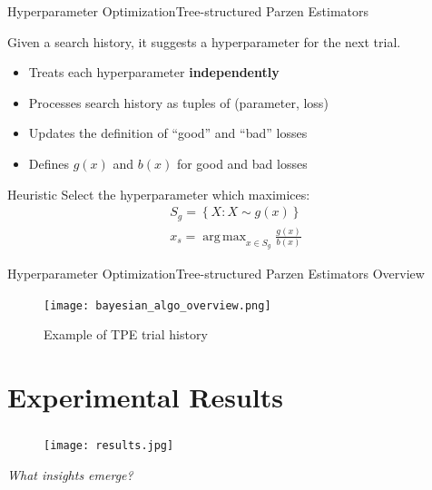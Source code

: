 \documentclass{beamer}
\DeclareMathOperator*{\argmax}{arg\,max}
\begin{document}
            \begin{frame}{Hyperparameter Optimization}{Tree-structured Parzen Estimators}

                Given a search history, it suggests a hyperparameter for the next trial.
                \begin{itemize}
                    \item Treats each hyperparameter \textbf{independently}
                    \item Processes search history as tuples of (parameter, loss)
                    \item Updates the definition of \enquote{good} and \enquote{bad} losses
                    \item Defines $g(x)$ and $b(x)$ for good and bad losses
                \end{itemize}

                \begin{exampleblock}{Heuristic}
                    Select the hyperparameter which maximices:
                    \begin{equation}
                        \begin{gathered}
                            S_g = \left\{X: X \sim g(x)\right\} \\
                            x_s = \argmax_{x \in S_g} \frac{g(x)}{b(x)}
                        \end{gathered}
                    \end{equation}
                \end{exampleblock}
            \end{frame}

            \begin{frame}{Hyperparameter Optimization}{Tree-structured Parzen Estimators Overview}
                \begin{figure}[placement]
                    \centering
                    \texttt{[image: bayesian\_algo\_overview.png]}
                    \caption{Example of TPE trial history \cite{pmlr-v139-tiao21a}}
                \end{figure}
            \end{frame}

    \section{Experimental Results}

        {
            \begin{frame}
                \frametitle{\insertsection}
                \begin{figure}
                    \centering
                    \texttt{[image: results.jpg]}
                \end{figure}
                \begin{center}
                    \textit{What insights emerge?}
                \end{center}
            \end{frame}
        }
\end{document}
